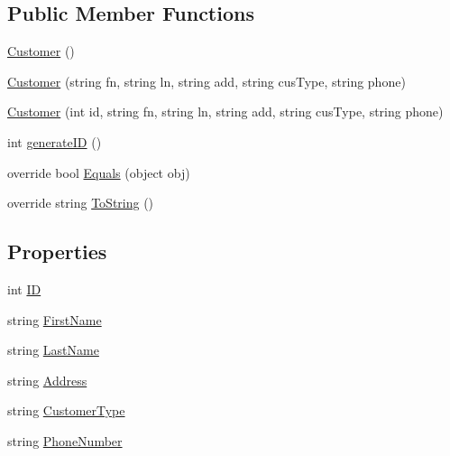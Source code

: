 \subsection*{Public Member Functions}
\begin{DoxyCompactItemize}
\item 
\hyperlink{class_health___assignment_1_1_customer_ae3e47b9915f6b294c8ad9b763832e4f4}{Customer} ()
\item 
\hyperlink{class_health___assignment_1_1_customer_a1cd6032c08142da729c3bc48c97dd5c4}{Customer} (string fn, string ln, string add, string cus\+Type, string phone)
\item 
\hyperlink{class_health___assignment_1_1_customer_a6135f9ce916a6fb42627deab1e4a6e2d}{Customer} (int id, string fn, string ln, string add, string cus\+Type, string phone)
\item 
int \hyperlink{class_health___assignment_1_1_customer_a877c996d37f087d8d3d561d32b5fd8bf}{generate\+ID} ()
\item 
override bool \hyperlink{class_health___assignment_1_1_customer_abb3313aa4449e186a538b5289206db62}{Equals} (object obj)
\item 
override string \hyperlink{class_health___assignment_1_1_customer_adbb311b7a2f7afedc6eee297eb5eafe8}{To\+String} ()
\end{DoxyCompactItemize}
\subsection*{Properties}
\begin{DoxyCompactItemize}
\item 
int \hyperlink{class_health___assignment_1_1_customer_abdb9c29a8cbe2d31025609db457fd473}{ID}
\item 
string \hyperlink{class_health___assignment_1_1_customer_aeed0a62c999045b46ff805960a50055b}{First\+Name}
\item 
string \hyperlink{class_health___assignment_1_1_customer_aef6aab4f93618abd0a9153fdd7324ced}{Last\+Name}
\item 
string \hyperlink{class_health___assignment_1_1_customer_a333d52f61161c27611f966f01b17f6aa}{Address}
\item 
string \hyperlink{class_health___assignment_1_1_customer_a490520eeb49f9440f36c9ba2f9c93cac}{Customer\+Type}
\item 
string \hyperlink{class_health___assignment_1_1_customer_a63694ce18bab053aecff306df8b9b0bf}{Phone\+Number}
\end{DoxyCompactItemize}


